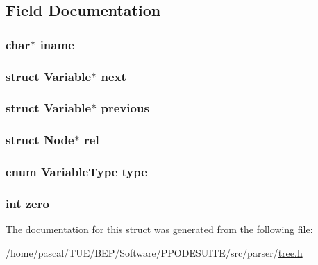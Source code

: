 \subsection{Field Documentation}
\hypertarget{struct_variable_a76c70ae7ac3d58ebe41da968fedb8093}{
\subsubsection[{iname}]{\setlength{\rightskip}{0pt plus 5cm}char$\ast$ iname}}\label{struct_variable_a76c70ae7ac3d58ebe41da968fedb8093}
\hypertarget{struct_variable_ac6387180163bef05cf8ea37a4fbd0682}{
\subsubsection[{next}]{\setlength{\rightskip}{0pt plus 5cm}struct {\bf Variable}$\ast$ next}}\label{struct_variable_ac6387180163bef05cf8ea37a4fbd0682}
\hypertarget{struct_variable_ad27df2f2e773678c5804cc233343aed1}{
\subsubsection[{previous}]{\setlength{\rightskip}{0pt plus 5cm}struct {\bf Variable}$\ast$ previous}}\label{struct_variable_ad27df2f2e773678c5804cc233343aed1}
\hypertarget{struct_variable_adf9b74cb9b4f3a80e8af89e50bd11975}{
\subsubsection[{rel}]{\setlength{\rightskip}{0pt plus 5cm}struct {\bf Node}$\ast$ rel}}\label{struct_variable_adf9b74cb9b4f3a80e8af89e50bd11975}
\hypertarget{struct_variable_a6d3af05ac5e896c45aeb8834fcbf84f4}{
\subsubsection[{type}]{\setlength{\rightskip}{0pt plus 5cm}enum {\bf Variable\-Type} type}}\label{struct_variable_a6d3af05ac5e896c45aeb8834fcbf84f4}
\hypertarget{struct_variable_a627f44b64b5d8d3ae8cb6a675f164405}{
\subsubsection[{zero}]{\setlength{\rightskip}{0pt plus 5cm}int zero}}\label{struct_variable_a627f44b64b5d8d3ae8cb6a675f164405}


The documentation for this struct was generated from the following file\-:\begin{DoxyCompactItemize}
\item 
/home/pascal/\-T\-U\-E/\-B\-E\-P/\-Software/\-P\-P\-O\-D\-E\-S\-U\-I\-T\-E/src/parser/\hyperlink{tree_8h}{tree.\-h}\end{DoxyCompactItemize}
